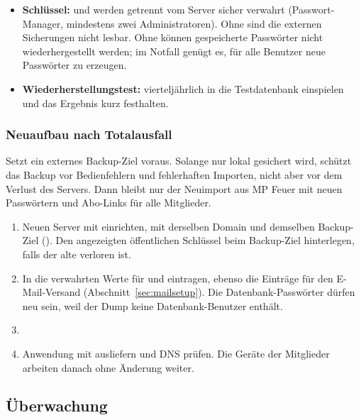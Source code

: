 \begin{itemize}
  \item \textbf{Schlüssel:}  und 
        werden getrennt vom Server sicher verwahrt (Passwort-Manager,
        mindestens zwei Administratoren). Ohne  sind
        die externen Sicherungen nicht lesbar. Ohne  können
        gespeicherte Passwörter nicht wiederhergestellt werden; im Notfall
        genügt es, für alle Benutzer neue Passwörter zu erzeugen.
  \item \textbf{Wiederherstellungstest:} vierteljährlich
         in die Testdatenbank einspielen
        und das Ergebnis kurz festhalten.
\end{itemize}

\subsubsection*{Neuaufbau nach Totalausfall}

Setzt ein externes Backup-Ziel voraus. Solange nur lokal gesichert wird,
schützt das Backup vor Bedienfehlern und fehlerhaften Importen, nicht aber
vor dem Verlust des Servers. Dann bleibt nur der Neuimport aus MP Feuer mit
neuen Passwörtern und Abo-Links für alle Mitglieder.

\begin{enumerate}
  \item Neuen Server mit  einrichten, mit
        derselben Domain und demselben Backup-Ziel (). Den
        angezeigten öffentlichen Schlüssel beim Backup-Ziel hinterlegen,
        falls der alte verloren ist.
  \item In  die verwahrten Werte für
         und  eintragen, ebenso die
        Einträge für den E-Mail-Versand (Abschnitt~\ref{sec:mailsetup}). Die
        Datenbank-Passwörter dürfen neu sein, weil der Dump keine
        Datenbank-Benutzer enthält.
  \item {}
  \item Anwendung mit  ausliefern und DNS prüfen. Die Geräte der
        Mitglieder arbeiten danach ohne Änderung weiter.
\end{enumerate}

\subsection{Überwachung}

